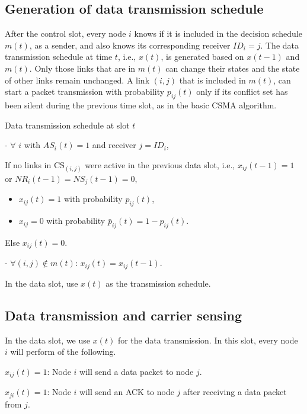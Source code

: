 \documentclass[10pt,onecolumn,draftclsnofoot,journal]{IEEEtran}
\begin{document}
\subsection*{Generation of data transmission schedule}
After the control slot, every node $i$ knows if it is included in the decision schedule $m(t)$, as a sender, and also knows its corresponding receiver $ID_i=j$. The data transmission schedule at time $t$, i.e., $x(t)$, is generated based on $x(t-1)$ and $m(t)$. Only those links that are in $m(t)$ can change their states and the state of other links remain unchanged. A link $(i,j)$ that is included in $m(t)$, can start a packet transmission with probability $p_{ij}(t)$ only if its conflict set has been silent during the previous time slot, as in the basic CSMA algorithm.
\begin{algorithm}\label{alg}
\caption{Data transmission schedule at slot $t$}
\begin{algorithmic}[1]
\STATE
- $\forall$ $i$ with $AS_i(t)=1$ and receiver $j=ID_i$,

If no links in $\mathrm{CS}_{(i,j)}$ were active in the previous data slot, i.e., $x_{ij}(t-1) = 1$ or $NR_i(t-1)=NS_j(t-1)=0$,
\begin{itemize}
\item $x_{ij}(t) = 1$ with probability $p_{ij}(t)$,
\item  $x_{ij} = 0$ with probability $\bar{p}_{ij}(t) = 1 - p_{ij}(t)$.
\end{itemize}
Else
 $x_{ij}(t) = 0$.


- $\forall (i,j) \notin m(t)$: $x_{ij}(t) = x_{ij}(t - 1)$.

\STATE In the data slot, use $x(t)$ as the transmission schedule.
\end{algorithmic}
\end{algorithm}
\subsection*{Data transmission and carrier sensing}
In the data slot, we use $x(t)$ for the data transmission. In this slot, every node $i$ will perform of the following.

$x_{ij}(t)=1$: Node $i$ will send a data packet to node $j$.

$x_{ji}(t)=1$: Node $i$ will send an ACK to node $j$ after receiving a data packet from $j$.
\end{document}
